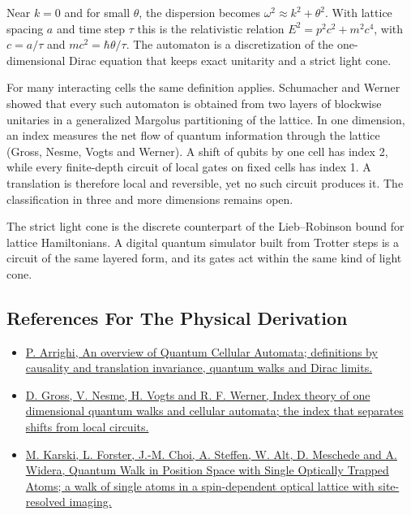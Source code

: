 \documentclass[11pt,oneside]{book}
\begin{document}
Near \(k=0\) and for small \(\theta\), the dispersion becomes \(\omega^2\approx k^2+\theta^2\). With lattice spacing \(a\) and time step \(\tau\) this is the relativistic relation \(E^2=p^2c^2+m^2c^4\), with \(c=a/\tau\) and \(mc^2=\hbar\theta/\tau\). The automaton is a discretization of the one-dimensional Dirac equation that keeps exact unitarity and a strict light cone.

For many interacting cells the same definition applies. Schumacher and Werner showed that every such automaton is obtained from two layers of blockwise unitaries in a generalized Margolus partitioning of the lattice. In one dimension, an index measures the net flow of quantum information through the lattice (Gross, Nesme, Vogts and Werner). A shift of qubits by one cell has index 2, while every finite-depth circuit of local gates on fixed cells has index 1. A translation is therefore local and reversible, yet no such circuit produces it. The classification in three and more dimensions remains open.

The strict light cone is the discrete counterpart of the Lieb--Robinson bound for lattice Hamiltonians. A digital quantum simulator built from Trotter steps is a circuit of the same layered form, and its gates act within the same kind of light cone.

\subsection*{References For The Physical Derivation}
\begin{itemize}
\item \href{https://arxiv.org/abs/1904.12956}{P. Arrighi, An overview of Quantum Cellular Automata; definitions by causality and translation invariance, quantum walks and Dirac limits.}
\item \href{https://arxiv.org/abs/0910.3675}{D. Gross, V. Nesme, H. Vogts and R. F. Werner, Index theory of one dimensional quantum walks and cellular automata; the index that separates shifts from local circuits.}
\item \href{https://arxiv.org/abs/0907.1565}{M. Karski, L. Forster, J.-M. Choi, A. Steffen, W. Alt, D. Meschede and A. Widera, Quantum Walk in Position Space with Single Optically Trapped Atoms; a walk of single atoms in a spin-dependent optical lattice with site-resolved imaging.}
\end{itemize}
\end{document}
